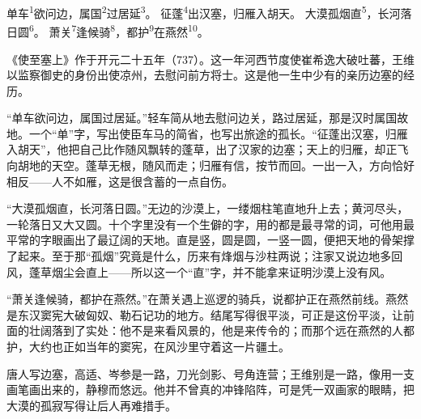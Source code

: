 
\begin{poem}
单车\textsuperscript{1}欲问边，属国\textsuperscript{2}过居延\textsuperscript{3}。
征蓬\textsuperscript{4}出汉塞，归雁入胡天。
大漠孤烟直\textsuperscript{5}，长河落日圆\textsuperscript{6}。
萧关\textsuperscript{7}逢候骑\textsuperscript{8}，都护\textsuperscript{9}在燕然\textsuperscript{10}。
\end{poem}

\begin{annotations}
\end{annotations}

\begin{appreciation}
《使至塞上》作于开元二十五年（737）。这一年河西节度使崔希逸大破吐蕃，王维以监察御史的身份出使凉州，去慰问前方将士。这是他一生中少有的亲历边塞的经历。

“单车欲问边，属国过居延。”轻车简从地去慰问边关，路过居延，那是汉时属国故地。一个“单”字，写出使臣车马的简省，也写出旅途的孤长。“征蓬出汉塞，归雁入胡天”，他把自己比作随风飘转的蓬草，出了汉家的边塞；天上的归雁，却正飞向胡地的天空。蓬草无根，随风而走；归雁有信，按节而回。一出一入，方向恰好相反——人不如雁，这是很含蓄的一点自伤。

“大漠孤烟直，长河落日圆。”无边的沙漠上，一缕烟柱笔直地升上去；黄河尽头，一轮落日又大又圆。十个字里没有一个生僻的字，用的都是最寻常的词，可他用最平常的字眼画出了最辽阔的天地。直是竖，圆是圆，一竖一圆，便把天地的骨架撑了起来。至于那“孤烟”究竟是什么，历来有烽烟与沙柱两说；注家又说边地多回风，蓬草烟尘会直上——所以这一个“直”字，并不能拿来证明沙漠上没有风。

“萧关逢候骑，都护在燕然。”在萧关遇上巡逻的骑兵，说都护正在燕然前线。燕然是东汉窦宪大破匈奴、勒石记功的地方。结尾写得很平淡，可正是这份平淡，让前面的壮阔落到了实处：他不是来看风景的，他是来传令的；而那个远在燕然的人都护，大约也正如当年的窦宪，在风沙里守着这一片疆土。

唐人写边塞，高适、岑参是一路，刀光剑影、号角连营；王维别是一路，像用一支画笔画出来的，静穆而悠远。他并不曾真的冲锋陷阵，可是凭一双画家的眼睛，把大漠的孤寂写得让后人再难措手。
\end{appreciation}
